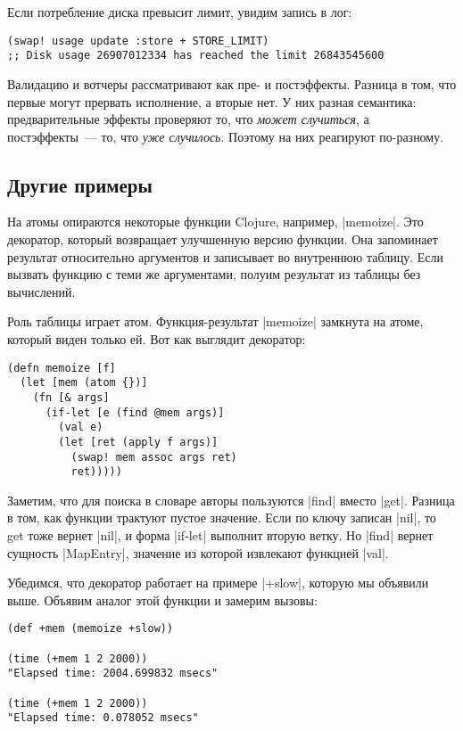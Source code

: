 \noindent
Если потребление диска превысит лимит, увидим запись в лог:

\begin{verbatim}
(swap! usage update :store + STORE_LIMIT)
;; Disk usage 26907012334 has reached the limit 26843545600
\end{verbatim}

Валидацию и вотчеры рассматривают как пре- и постэффекты. Разница в том, что
первые могут прервать исполнение, а вторые нет. У них разная семантика:
предварительные эффекты проверяют то, что \emph{может случиться}, а
постэффекты~--- то, что \emph{уже случилось}. Поэтому на них реагируют
по-разному.

\subsection{Другие примеры}

На атомы опираются некоторые функции Clojure, например, \spverb|memoize|. Это
декоратор, который возвращает улучшенную версию функции. Она запоминает
результат относительно аргументов и записывает во внутреннюю таблицу. Если
вызвать функцию с теми же аргументами, полуим результат из таблицы без
вычислений.

Роль таблицы играет атом. Функция-результат \spverb|memoize| замкнута на атоме,
который виден только ей. Вот как выглядит декоратор:

\begin{verbatim}
(defn memoize [f]
  (let [mem (atom {})]
    (fn [& args]
      (if-let [e (find @mem args)]
        (val e)
        (let [ret (apply f args)]
          (swap! mem assoc args ret)
          ret)))))
\end{verbatim}

Заметим, что для поиска в словаре авторы пользуются \spverb|find| вместо
\spverb|get|. Разница в том, как функции трактуют пустое значение. Если по ключу
записан \spverb|nil|, то get тоже вернет \spverb|nil|, и форма \spverb|if-let|
выполнит вторую ветку. Но \spverb|find| вернет сущность \spverb|MapEntry|,
значение из которой извлекают функцией \spverb|val|.

Убедимся, что декоратор работает на примере \spverb|+slow|, которую мы объявили
выше. Объявим аналог этой функции и замерим вызовы:

\begin{verbatim}
(def +mem (memoize +slow))

(time (+mem 1 2 2000))
"Elapsed time: 2004.699832 msecs"

(time (+mem 1 2 2000))
"Elapsed time: 0.078052 msecs"
\end{verbatim}


